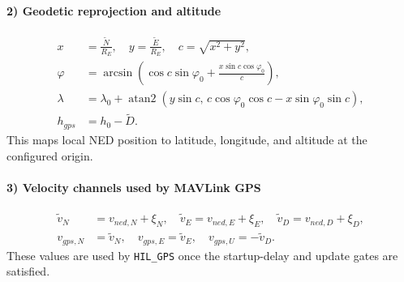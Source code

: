 \documentclass[11pt,a4paper]{article}
\begin{document}
\paragraph{2) Geodetic reprojection and altitude}
\begin{align}
x &= \frac{\tilde{N}}{R_E}, \quad y=\frac{\tilde{E}}{R_E}, \quad c=\sqrt{x^2+y^2}, \\
\varphi &= \arcsin\left(\cos c\sin\varphi_0 + \frac{x\sin c\cos\varphi_0}{c}\right), \\
\lambda &= \lambda_0 + \operatorname{atan2}\left(y\sin c,\,c\cos\varphi_0\cos c - x\sin\varphi_0\sin c\right), \\
h_{gps} &= h_0 - \tilde{D}.
\end{align}
This maps local NED position to latitude, longitude, and altitude at the configured origin.

\paragraph{3) Velocity channels used by MAVLink GPS}
\begin{align}
\tilde{v}_N &= v_{ned,N}+\xi_N, \quad \tilde{v}_E=v_{ned,E}+\xi_E, \quad \tilde{v}_D=v_{ned,D}+\xi_D, \\
v_{gps,N} &= \tilde{v}_N, \quad v_{gps,E}=\tilde{v}_E, \quad v_{gps,U}=-\tilde{v}_D.
\end{align}
These values are used by \texttt{HIL\_GPS} once the startup-delay and update gates are satisfied.
\end{document}
